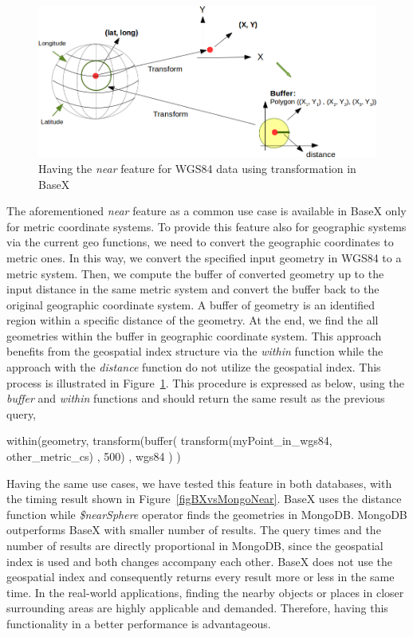 \documentclass[a4paper,12pt]{article}
\begin{document}
\begin{figure}
\centering
\includegraphics[width=\textwidth]{Transform}
\caption{Having the \textit{near} feature for WGS84 data using transformation in BaseX}
\label{figTransform}
\end{figure}

The aforementioned \textit{near} feature as a common use case is available in BaseX only for metric coordinate systems. To provide this feature also for geographic systems via the current geo functions, we need to convert the geographic coordinates to metric ones. In this way, we convert the specified input geometry in WGS84 to a metric system. Then, we compute the buffer of converted geometry up to the input distance in the same metric system and convert the buffer back to the original geographic coordinate system. A buffer of geometry is an identified region within a specific distance of the geometry. At the end, we find the all geometries within the buffer in geographic coordinate system. This approach benefits from the geospatial index structure via the \textit{within} function while the approach with the \textit{distance} function do not utilize the geospatial index. This process is illustrated in Figure~\ref{figTransform}. 
This procedure is expressed as below, using the \textit{buffer} and \textit{within} functions and should return the same result as the previous query, 

\vspace{10px}
\begin{fakeJSON} 
within(geometry,
       transform(buffer(
                   transform(myPoint_in_wgs84, other_metric_cs)
                   , 500)
                 , wgs84
                )
      )
\end{fakeJSON}
\vspace{10px}
Having the same use cases, we have tested this feature in both databases, with the timing result shown in Figure~\ref{figBXvsMongoNear}. BaseX uses the distance function while \textit{\$nearSphere} operator finds the geometries in MongoDB. MongoDB outperforms BaseX with smaller number of results. The query times and the number of results are directly proportional in MongoDB, since the geospatial index is used and both changes accompany each other. BaseX does not use the geospatial index and consequently returns every result more or less in the same time. In the real-world applications, finding the nearby objects or places in closer surrounding areas are highly applicable and demanded. Therefore, having this functionality in a better performance is advantageous.
\end{document}
